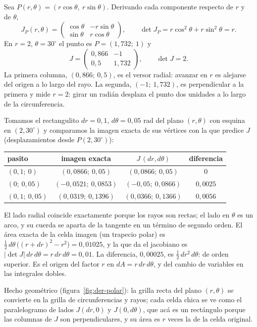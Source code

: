 \begin{ejemplo}\label{ej:der-polares}
Sea \(P(r,\theta)=(r\cos\theta,\ r\sin\theta)\). Derivando cada componente respecto de \(r\) y
de \(\theta\),
\[
  J_P(r,\theta)=\begin{pmatrix}\cos\theta&-r\sin\theta\\ \sin\theta&r\cos\theta\end{pmatrix},
  \qquad \det J_P=r\cos^2\theta+r\sin^2\theta=r .
\]
En \(r=2\), \(\theta=30^\circ\) el punto es \(P=(1{,}732;\ 1)\) y
\[
  J=\begin{pmatrix}0{,}866&-1\\0{,}5&1{,}732\end{pmatrix},\qquad \det J=2 .
\]
La primera columna, \((0{,}866;\ 0{,}5)\), es el versor radial: avanzar en \(r\) es alejarse
del origen a lo largo del rayo. La segunda, \((-1;\ 1{,}732)\), es perpendicular a la primera y
mide \(r=2\): girar un radián desplaza el punto dos unidades a lo largo de la circunferencia.

Tomamos el rectangulito \(dr=0{,}1\), \(d\theta=0{,}05\) rad del plano \((r,\theta)\) con
esquina en \((2,30^\circ)\) y comparamos la imagen exacta de sus vértices con la que predice
\(J\) (desplazamientos desde \(P(2,30^\circ)\)):
\begin{center}
\begin{tabular}{lccc}
pasito & imagen exacta & \(J\,(dr,d\theta)\) & diferencia\\\hline
\((0{,}1;\ 0)\) & \((0{,}0866;\ 0{,}05)\) & \((0{,}0866;\ 0{,}05)\) & \(0\)\\
\((0;\ 0{,}05)\) & \((-0{,}0521;\ 0{,}0853)\) & \((-0{,}05;\ 0{,}0866)\) & \(0{,}0025\)\\
\((0{,}1;\ 0{,}05)\) & \((0{,}0319;\ 0{,}1396)\) & \((0{,}0366;\ 0{,}1366)\) & \(0{,}0056\)
\end{tabular}
\end{center}
El lado radial coincide exactamente porque los rayos son rectas; el lado en \(\theta\) es un
arco, y su cuerda se aparta de la tangente en un término de segundo orden. El área exacta de
la celda imagen (un trapecio polar) es
\(\tfrac12\,d\theta\,\bigl((r+dr)^2-r^2\bigr)=0{,}01025\), y la que da el jacobiano es
\(\lvert\det J\rvert\,dr\,d\theta=r\,dr\,d\theta=0{,}01\). La diferencia, \(0{,}00025\), es
\(\tfrac12\,dr^2\,d\theta\): de orden superior. Es el origen del factor \(r\) en
\(dA=r\,dr\,d\theta\), y del cambio de variables en las integrales dobles.

Hecho geométrico (figura~\ref{fig:der-polar}): la grilla recta del plano \((r,\theta)\) se
convierte en la grilla de circunferencias y rayos; cada celda chica se ve como el
paralelogramo de lados \(J(dr,0)\) y \(J(0,d\theta)\), que acá es un rectángulo porque las
columnas de \(J\) son perpendiculares, y su área es \(r\) veces la de la celda original.
\end{ejemplo}

